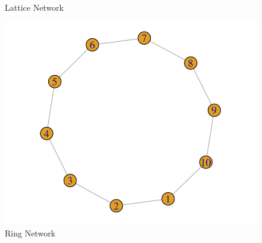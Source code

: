 \begin{figure}
\begin{minipage}{.3\textwidth}
  \caption{Lattice Network}
  \label{fig:lattice}
\end{minipage}
\begin{minipage}{.3\textwidth}
  \centering
  \includegraphics[width=.7\linewidth]{figures/ring.png}
  \caption{Ring Network}
  \label{fig:ring}
\end{minipage}
\end{figure}

